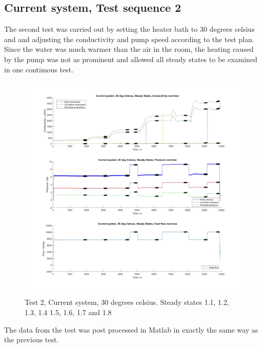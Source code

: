\newpage

\subsection{Current system, Test sequence 2}

The second test was carried out by setting the heater bath to 30 degrees celsius and and adjusting the conductivity and pump speed according to the test plan. Since the water was much warmer than the air in the room, the heating caused by the pump was not as prominent and allowed all steady states to be examined in one contimous test.

\begin{figure}[H]
    \centering
    \includegraphics[width=1.1\textwidth]{overview30}
    \caption{Test 2, Current system, 30 degrees celsius. Steady states 1.1, 1.2, 1.3, 1.4 1.5, 1.6, 1.7 and 1.8}
    \label{fig:PressConn}
\end{figure}

\newpage


The data from the test was post processed in Matlab in exactly the same way as the previous test.


